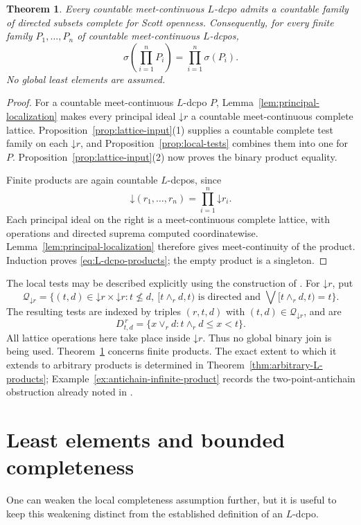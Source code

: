 \documentclass[11pt,reqno]{amsart}
\newtheorem{theorem}{Theorem}[section]
\theoremstyle{definition}
\theoremstyle{remark}
\numberwithin{equation}{section}
\newcommand{\down}[1]{\mathord{\downarrow}#1}
\newcommand{\Sc}{\sigma}
\newcommand{\mc}{\wedge}
\newcommand{\jc}{\vee}
\begin{document}
\begin{theorem}\label{thm:L-dcpo-products}
Every countable meet-continuous $L$-dcpo admits a countable family of directed subsets complete for Scott openness. Consequently, for every finite family $P_1,\ldots,P_n$ of countable meet-continuous $L$-dcpos,
\begin{equation}\label{eq:L-dcpo-products}
 \Sc\!\left(\prod_{i=1}^{n}P_i\right)
 =\prod_{i=1}^{n}\Sc(P_i).
\end{equation}
No global least elements are assumed.
\end{theorem}
\begin{proof}
For a countable meet-continuous $L$-dcpo $P$, Lemma~\ref{lem:principal-localization} makes every principal ideal $\down r$ a countable meet-continuous complete lattice. Proposition~\ref{prop:lattice-input}\textup{(1)} supplies a countable complete test family on each $\down r$, and Proposition~\ref{prop:local-tests} combines them into one for $P$. Proposition~\ref{prop:lattice-input}\textup{(2)} now proves the binary product equality.

Finite products are again countable $L$-dcpos, since
\[
 \down(r_1,\ldots,r_n)=\prod_{i=1}^{n}\down r_i.
\]
Each principal ideal on the right is a meet-continuous complete lattice, with operations and directed suprema computed coordinatewise. Lemma~\ref{lem:principal-localization} therefore gives meet-continuity of the product. Induction proves \eqref{eq:L-dcpo-products}; the empty product is a singleton.
\end{proof}

The local tests may be described explicitly using the construction of \cite[Proposition~3.3]{XuJi}. For $\down r$, put
\[
 \mathcal Q_{\down r}=\{(t,d)\in \down r\times \down r : t\nleq d,\ [t\mc_r d,t)
     \text{ is directed and }\bigvee[t\mc_r d,t)=t\}.
\]
The resulting tests are indexed by triples $(r,t,d)$ with $(t,d)\in\mathcal Q_{\down r}$, and are
\[
 D^{\,r}_{t,d}=\{x\jc_r d:t\mc_r d\le x<t\}.
\]
All lattice operations here take place inside $\down r$. Thus no global binary join is being used. Theorem~\ref{thm:L-dcpo-products} concerns finite products. The exact extent to which it extends to arbitrary products is determined in Theorem~\ref{thm:arbitrary-L-products}; Example~\ref{ex:antichain-infinite-product} records the two-point-antichain obstruction already noted in \cite[Section~5]{XuJi}.

\section{Least elements and bounded completeness}\label{sec:bottom}
One can weaken the local completeness assumption further, but it is useful to keep this weakening distinct from the established definition of an $L$-dcpo.
\end{document}

